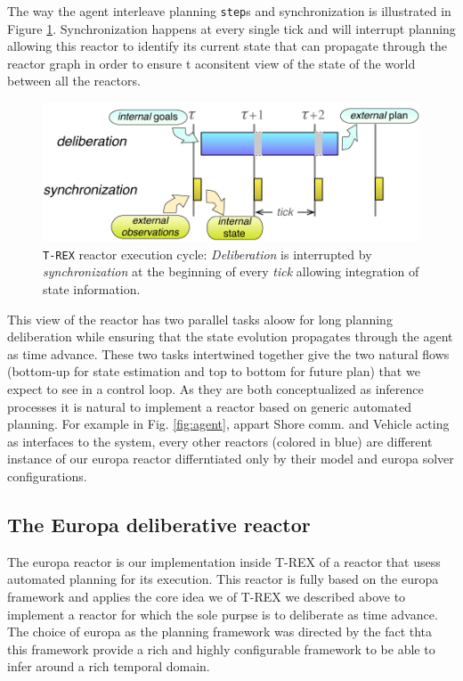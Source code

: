 The way the agent interleave planning \texttt{step}s and
synchronization is illustrated in Figure \ref{fig:tick-exec}.
Synchronization happens at every single tick and will interrupt
planning allowing this reactor to identify its current state that can
propagate through the reactor graph in order to ensure t aconsitent
view of the state of the world between all the reactors.  
\begin{figure}[!htbp]
  \centering
  \vskip-1pc
  \includegraphics[width=0.55\columnwidth]{figs/tick-cycle}
  \caption{\small \texttt{T-REX} reactor execution cycle: {\em
      Deliberation} is interrupted by {\em synchronization} at the
    beginning of every {\em tick} allowing integration of state
    information.}
  \label{fig:tick-exec}
  \vskip-0.8pc
\end{figure}
This view of the reactor has two parallel tasks aloow for long
planning deliberation while ensuring that the state evolution
propagates through the agent as time advance. These two tasks 
intertwined together give the two natural flows (bottom-up for state
estimation and top to bottom for future plan) that we expect to see in
a control loop. As they are both conceptualized as inference processes
it is natural to implement a reactor based on generic automated
planning. For example in Fig. \ref{fig:agent}, appart \textsf{Shore
  comm.} and \textsf{Vehicle} acting as interfaces to the system,
every other reactors (colored in blue) are different instance of our
europa reactor differntiated only by their model and europa solver
configurations. 

\subsection{The Europa deliberative reactor}
\label{sec:arch:europa}

The europa reactor is our implementation inside T-REX of a reactor
that usess automated planning for its execution. This reactor is fully
based on the europa framework and applies the core idea we of T-REX we
described above to implement a reactor for which the sole purpse is to
deliberate as time advance. The choice of europa as the planning
framework was directed by the fact thta this framework provide  a rich
and highly configurable framework to be able to infer around a rich
temporal domain.

